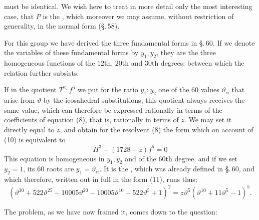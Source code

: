  must be identical. We wish here to treat in more detail only the most interesting case, that $P$ is the , which moreover we may assume, without restriction of generality, in the normal form (\S.\,58).

For this group we have derived the three fundamental forms in \S.\,60. If we denote the variables of these fundamental forms by $y_1, y_2$, they are the three homogeneous functions of the $12$th, $20$th and $30$th degrees:
between which the relation
further subsists.

If in the quotient $T^2 : f^5$ we put for the ratio $y_1 : y_2$ one of the 60 values $\vartheta_\alpha$ that arise from $\vartheta$ by the icosahedral substitutions, this quotient always receives the same value, which can therefore be expressed rationally in terms of the coefficients of equation (8), that is, rationally in terms of $z$. We may set it directly equal to $z$, and obtain for the resolvent (8) the form
which on account of (10) is equivalent to
\[
H^3 - (1728 - z) f^5 = 0
\]
This equation is homogeneous in $y_1, y_2$ and of the $60$th degree, and if we set $y_2 = 1$, its 60 roots are $y_1 = \vartheta_\alpha$. It is the , which was already defined in \S.\,60, and which therefore, written out in full in the form (11), runs thus:
\[
(\vartheta^{30} + 522 \vartheta^{25} - 10005 \vartheta^{20} - 10005 \vartheta^{10} - 522 \vartheta^5 + 1)^2 = z \vartheta^5 (\vartheta^{10} + 11 \vartheta^5 - 1)^5.
\]

The problem, as we have now framed it, comes down to the question:


